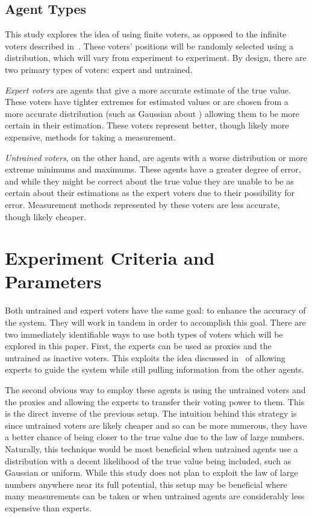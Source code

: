 
\subsection{Agent Types}\label{subsec:agent-types}
This study explores the idea of using finite voters, as opposed to the
infinite voters described in~\cite{Cohensius2017}.
These voters' positions will be randomly selected using a distribution, which
will vary from experiment to experiment.
By design, there are two primary types of voters: expert and untrained.

\textit{Expert voters} are agents that give a more accurate estimate of the
true value.
These voters have tighter extremes for estimated values or are chosen from
a more accurate distribution (such as Gaussian about \truth) allowing
them to be more certain in their estimation.
These voters represent better, though likely more expensive, methods for
taking a measurement.  %

\textit{Untrained voters}, on the other hand, are agents with a worse
distribution or more extreme minimums and maximums.
These agents have a greater degree of error, and while they might be correct
about the true value they are unable to be as certain about their estimations
as the expert voters due to their possibility for error.
Measurement methods represented by these voters are less accurate, though
likely cheaper.  %



\section{Experiment Criteria and Parameters}\label{sec:experiment-criteria
-and-parameters}
Both untrained and expert voters have the same goal: to enhance the accuracy of
the system.
They will work in tandem in order to accomplish this goal.
There are two immediately identifiable ways to use both types of voters which
will be explored in this paper.
First, the experts can be used as proxies and the untrained as inactive voters.
This exploits the idea discussed in~\cite{Miller1969, Mueller1972} of
allowing experts to guide the system while still pulling information from the
other agents.

The second obvious way to employ these agents is using the untrained voters
and the proxies and allowing the experts to transfer their voting power to them.
This is the direct inverse of the previous setup.
The intuition behind this strategy is since untrained voters are likely
cheaper and so can be more numerous, they have a better chance of being closer
to the true value due to the law of large numbers.
Naturally, this technique would be most beneficial when untrained agents use a
distribution with a decent likelihood of the true value being included, such
as Gaussian or uniform.
While this study does not plan to exploit the law of large numbers anywhere
near its full potential, this setup may be beneficial where many measurements
can be taken or when untrained agents are considerably less expensive than
experts.

